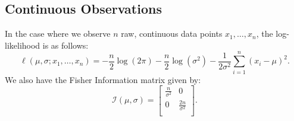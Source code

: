 \documentclass[11pt,a4,twosided,singlespacing,titlepagenumber=on,numbers=endperiod]{scrreprt}
\numberwithin{equation}{chapter} %
\theoremstyle{remark}
\begin{document}
\subsection{Continuous Observations}
In the case where we observe $n$ raw, continuous data points $x_1, \dots, x_n$, the log-likelihood is as follows:
\begin{equation*}
	\ell(\mu, \sigma; x_1, \dots, x_n) = -\frac{n}{2} \log(2 \pi) - \frac{n}{2} \log(\sigma^2) - \frac{1}{2 \sigma^2} \sum_{i=1}^n (x_i - \mu)^2.
\end{equation*}
We also have the Fisher Information matrix given by:
\begin{equation*}
	\mathcal{I}(\mu, \sigma) = \begin{bmatrix}
		\frac{n}{\sigma^2} & 0\\
		0 & \frac{2n}{\sigma^2}\\
	\end{bmatrix}.
\end{equation*}
\end{document}
